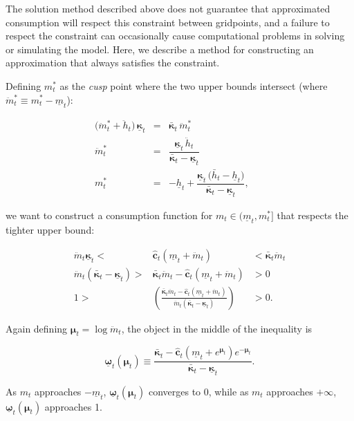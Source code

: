 \documentclass[twocolumn, switch]{article}
\newcommand{\mNrm}{m}
\newcommand{\cFunc}{\mathbf{c}}
\newcommand{\hNrm}{h}
\newcommand{\hNrmOpt}{\bar{\hNrm}}
\newcommand{\MPC}{\boldsymbol{\kappa}}
\newcommand{\MPCmin}{\underline{\MPC}}
\newcommand{\hNrmPes}{\underline{\hNrm}}
\newcommand{\mNrmMin}{\underline{\mNrm}}
\newcommand{\mNrmEx}{\ddot{\mNrm}}
\newcommand{\hNrmEx}{\ddot{\hNrm}}
\newcommand{\cFuncReal}{\hat{\cFunc}}
\newcommand{\logmNrmEx}{\boldsymbol{\mu}}
\newcommand{\MPCmax}{\bar{\MPC}}
\newcommand{\mNrmCusp}{\mNrm^*}
\newcommand{\mNrmCuspEx}{\ddot{\mNrm}^*}
\newcommand{\modRtePes}{\boldsymbol{\underline{\omega}}}
\begin{document}
The solution method described above does not guarantee that approximated
consumption will respect this constraint between gridpoints, and a failure to
respect the constraint can occasionally cause computational problems in solving
or simulating the model. Here, we describe a method for constructing an
approximation that always satisfies the constraint.

Defining $\mNrmCusp_{t}$ as the \textit{cusp} point where the two upper bounds intersect
(where $\mNrmCuspEx_{t}\equiv\mNrmCusp_{t} -\mNrmMin_{t}$):

\begin{equation}
\begin{array}{rclcll}
\bigl(\mNrmCuspEx_{t} + \hNrmEx_{t}\bigr)\,\MPCmin_{t} &= & \MPCmax_{t}\,\mNrmCuspEx_{t} & & \\
\mNrmCuspEx_{t} &= & \dfrac{\MPCmin_{t}\,\hNrmEx_{t}}{\MPCmax_{t}-\MPCmin_{t}} & & \\
\mNrmCusp_{t} &= & -\hNrmPes_{t} + \dfrac{\MPCmin_{t}\,\bigl(\hNrmOpt_{t}-\hNrmPes_{t}\bigr)}{\MPCmax_{t}-\MPCmin_{t}},
\end{array}
\end{equation}

we want to construct a consumption function for
$\mNrm_{t} \in (\mNrmMin_{t}, \mNrmCusp_{t}]$ that respects the tighter upper
bound:

\begin{equation}
\begin{array}{rcl}
\mNrmEx_{t} \MPCmin_{t} < & \cFuncReal_{t}(\mNrmMin_{t}+\mNrmEx_{t}) & < \MPCmax_{t} \mNrmEx_{t} \\
\mNrmEx_{t}(\MPCmax_{t}- \MPCmin_{t}) > & \MPCmax_{t} \mNrmEx_{t}-\cFuncReal_{t}(\mNrmMin_{t}+\mNrmEx_{t}) & > 0 \\
1 > & \left(\frac{\MPCmax_{t} \mNrmEx_{t}-\cFuncReal_{t}(\mNrmMin_{t}+\mNrmEx_{t})}{\mNrmEx_{t}(\MPCmax_{t}- \MPCmin_{t})}\right) & > 0.
\end{array}
\end{equation}

Again defining $\logmNrmEx_{t} =\log \mNrmEx_{t}$, the object in the middle of
the inequality is

\begin{equation}
\label{eq:koppaLo}
\modRtePes_{t}(\logmNrmEx_{t}) \equiv  \frac{\MPCmax_{t}-\cFuncReal_{t}(\mNrmMin_{t}+e^{\logmNrmEx_{t}})e^{-\logmNrmEx_{t}}}{\MPCmax_{t}-\MPCmin_{t}}.
\end{equation}

As $\mNrm_{t}$ approaches $-\mNrmMin_{t}$, $\modRtePes_{t}(\logmNrmEx_{t})$
converges to 0, while as $\mNrm_{t}$ approaches $+\infty$,
$\modRtePes_{t}(\logmNrmEx_{t})$ approaches 1.
\end{document}
